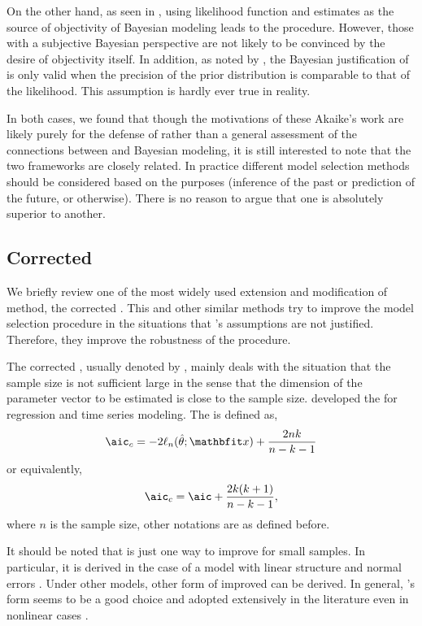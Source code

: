 On the other hand, as seen in \cite{Akaike:1980gh}, using likelihood
function and \aic estimates as the source of objectivity of Bayesian
modeling leads to the \bic procedure. However, those with a subjective
Bayesian perspective are not likely to be convinced by the desire of
objectivity itself. In addition, as noted by \cite{Kass:1995vb}, the
Bayesian justification of \aic is only valid when the precision of the prior
distribution is comparable to that of the likelihood. This assumption is
hardly ever true in reality.

In both cases, we found that though the motivations of these Akaike's work are
likely purely for the defense of \aic rather than a general assessment of the
connections between \aic and Bayesian modeling, it is still interested to note
that the two frameworks are closely related. In practice different model
selection methods should be considered based on the purposes (inference of the
past or prediction of the future, or otherwise). There is no reason to argue
that one is absolutely superior to another.

\subsection{Corrected \protect\aic}
\label{sub:Corrected aic}

We briefly review one of the most widely used extension and modification of
\aic method, the corrected \aic. This and other similar methods try to improve
the model selection procedure in the situations that
\cite{Akaike:1973uc}'s assumptions are not justified. Therefore, they
improve the robustness of the \aic procedure.

The corrected \aic, usually denoted by \aicc, mainly deals with the situation
that the sample size is not sufficient large in the sense that the dimension
of the parameter vector to be estimated is close to the sample size.
\cite{Hurvich:1989ev} developed the \aicc for regression and time series
modeling. The \aicc is defined as,
\begin{equation}
  \text{\aicc} = -2\ell_n(\hat\theta;\bfx) + \frac{2nk}{n-k-1}
\end{equation}
or equivalently,
\begin{equation}
  \text{\aicc} = \text{\aic} + \frac{2k(k+1)}{n-k-1},
\end{equation}
where $n$ is the sample size, other notations are as defined before.

It should be noted that \aicc is just one way to improve \aic for small
samples. In particular, it is derived in the case of a model with linear
structure and normal errors \cite{Hurvich:1989ev, Burnham:2002wc}. Under
other models, other form of improved \aic can be derived. In general,
\cite{Hurvich:1989ev}'s form seems to be a good choice and adopted
extensively in the literature even in nonlinear cases
\cite[e.g.,][]{Turkheimer:2003iy}.

